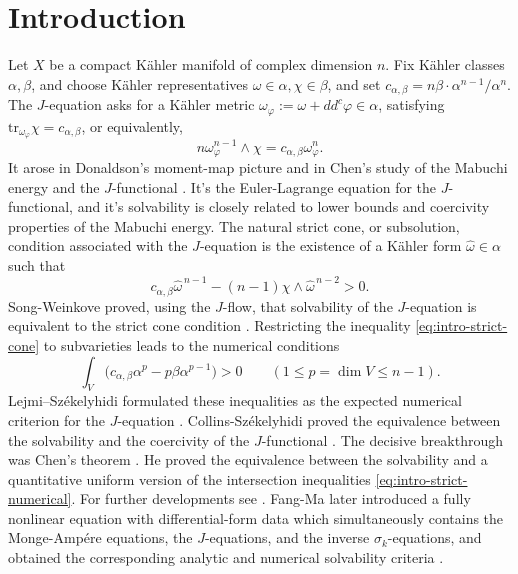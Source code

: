 \documentclass[reqno]{amsart}
\theoremstyle{remark}
\def\tr{\text{tr}}
\newcommand{\ddc}{dd^c}
\newcommand{\cab}{c_{\alpha,\beta}}
\theoremstyle{plain}
\begin{document}
\section{Introduction}
Let $X$ be a compact K\"ahler manifold of complex dimension $n$. Fix K\"ahler classes $\alpha,\beta$, and choose K\"ahler representatives $\omega\in \alpha, \chi\in \beta$, and set $c_{\alpha,\beta}=n\beta\cdot\alpha^{n-1}/{\alpha^n}$. 
The $J$-equation asks for a K\"ahler metric $\omega_\varphi:=\omega+\ddc \varphi\in \alpha$, satisfying $\tr_{\omega_\varphi}\chi=\cab$, or equivalently, \begin{equation}
\label{eq-J-equation}
n\omega_\varphi^{n-1}\wedge\chi=\cab\omega_\varphi^n.
\end{equation}
It arose in Donaldson's moment-map picture \cite{D99} and in Chen's study of the Mabuchi energy and the $J$-functional \cite{C00}. It's the Euler-Lagrange equation for the $J$-functional, and it's solvability is closely related to lower bounds and coercivity properties of the Mabuchi energy. 
The natural strict cone, or subsolution, condition associated with the $J$-equation is the existence of a K\"ahler form $\widehat\omega\in\alpha$ such that
\begin{equation}\label{eq:intro-strict-cone}
 \cab\widehat\omega^{\,n-1}
 -(n-1)\chi\wedge\widehat\omega^{\,n-2}>0.
\end{equation}
Song-Weinkove proved, using the $J$-flow, that solvability of the $J$-equation is equivalent to the strict cone condition \cite{SW08}.  
Restricting the inequality \eqref{eq:intro-strict-cone} to subvarieties leads to the numerical conditions \begin{equation}\label{eq:intro-strict-numerical}
 \int_V\bigl(\cab\alpha^p-p\beta\alpha^{p-1}\bigr)>0
 \qquad
 (1\leq p=\dim V\leq n-1).
\end{equation}
Lejmi--Sz\'ekelyhidi formulated these inequalities as the expected
numerical criterion for the $J$-equation \cite{LS15}. Collins-Sz\'ekelyhidi proved the equivalence between the solvability and the coercivity of the $J$-functional \cite{CS17}. The
decisive breakthrough was Chen's theorem
\cite[Theorem~1.1]{C21}.  He proved the equivalence between the
solvability and a quantitative uniform
version of the intersection inequalities \eqref{eq:intro-strict-numerical}. For further developments see \cite{DP21,S20}. Fang-Ma later introduced a fully nonlinear equation with differential-form data which simultaneously contains the Monge-Amp\'ere equations, the $J$-equations, and the inverse $\sigma_k$-equations, and obtained the corresponding analytic and numerical solvability criteria \cite{FM24}.
\end{document}
